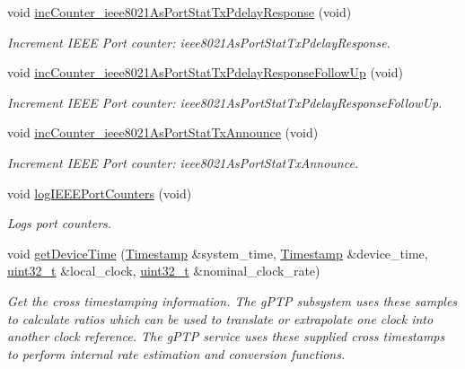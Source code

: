 \begin{DoxyCompactItemize}
void \hyperlink{class_common_port_a087395d74c2c83289e02a786b0c2e874}{inc\+Counter\+\_\+ieee8021\+As\+Port\+Stat\+Tx\+Pdelay\+Response} (void)
\begin{DoxyCompactList}\small\item\em Increment I\+E\+EE Port counter\+: ieee8021\+As\+Port\+Stat\+Tx\+Pdelay\+Response. \end{DoxyCompactList}\item 
void \hyperlink{class_common_port_affb0d1a3b1dd0a337af7e1b64a8b8bd8}{inc\+Counter\+\_\+ieee8021\+As\+Port\+Stat\+Tx\+Pdelay\+Response\+Follow\+Up} (void)
\begin{DoxyCompactList}\small\item\em Increment I\+E\+EE Port counter\+: ieee8021\+As\+Port\+Stat\+Tx\+Pdelay\+Response\+Follow\+Up. \end{DoxyCompactList}\item 
void \hyperlink{class_common_port_ac20ce3b8128ccb0d3015c14fbf126737}{inc\+Counter\+\_\+ieee8021\+As\+Port\+Stat\+Tx\+Announce} (void)
\begin{DoxyCompactList}\small\item\em Increment I\+E\+EE Port counter\+: ieee8021\+As\+Port\+Stat\+Tx\+Announce. \end{DoxyCompactList}\item 
void \hyperlink{class_common_port_a90b2bf70ecdd2df54ce464d19aa921a8}{log\+I\+E\+E\+E\+Port\+Counters} (void)
\begin{DoxyCompactList}\small\item\em Logs port counters. \end{DoxyCompactList}\item 
void \hyperlink{class_common_port_a16ab03ee31d5e246f05098d1e89f2537}{get\+Device\+Time} (\hyperlink{class_timestamp}{Timestamp} \&system\+\_\+time, \hyperlink{class_timestamp}{Timestamp} \&device\+\_\+time, \hyperlink{parse_8c_a6eb1e68cc391dd753bc8ce896dbb8315}{uint32\+\_\+t} \&local\+\_\+clock, \hyperlink{parse_8c_a6eb1e68cc391dd753bc8ce896dbb8315}{uint32\+\_\+t} \&nominal\+\_\+clock\+\_\+rate)
\begin{DoxyCompactList}\small\item\em Get the cross timestamping information. The g\+P\+TP subsystem uses these samples to calculate ratios which can be used to translate or extrapolate one clock into another clock reference. The g\+P\+TP service uses these supplied cross timestamps to perform internal rate estimation and conversion functions. \end{DoxyCompactList}\item 

\end{DoxyCompactItemize}
